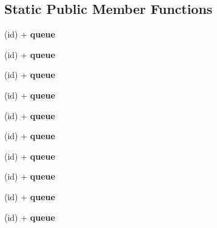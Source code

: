 \subsection*{\-Static \-Public \-Member \-Functions}
\begin{DoxyCompactItemize}
\item 
\hypertarget{interface_a_s_i_network_queue_af2b6cbcf9ce67a2480aeb8114a142941}{
(id) + {\bfseries queue}}
\label{interface_a_s_i_network_queue_af2b6cbcf9ce67a2480aeb8114a142941}

\item 
\hypertarget{interface_a_s_i_network_queue_af2b6cbcf9ce67a2480aeb8114a142941}{
(id) + {\bfseries queue}}
\label{interface_a_s_i_network_queue_af2b6cbcf9ce67a2480aeb8114a142941}

\item 
\hypertarget{interface_a_s_i_network_queue_af2b6cbcf9ce67a2480aeb8114a142941}{
(id) + {\bfseries queue}}
\label{interface_a_s_i_network_queue_af2b6cbcf9ce67a2480aeb8114a142941}

\item 
\hypertarget{interface_a_s_i_network_queue_af2b6cbcf9ce67a2480aeb8114a142941}{
(id) + {\bfseries queue}}
\label{interface_a_s_i_network_queue_af2b6cbcf9ce67a2480aeb8114a142941}

\item 
\hypertarget{interface_a_s_i_network_queue_af2b6cbcf9ce67a2480aeb8114a142941}{
(id) + {\bfseries queue}}
\label{interface_a_s_i_network_queue_af2b6cbcf9ce67a2480aeb8114a142941}

\item 
\hypertarget{interface_a_s_i_network_queue_af2b6cbcf9ce67a2480aeb8114a142941}{
(id) + {\bfseries queue}}
\label{interface_a_s_i_network_queue_af2b6cbcf9ce67a2480aeb8114a142941}

\item 
\hypertarget{interface_a_s_i_network_queue_af2b6cbcf9ce67a2480aeb8114a142941}{
(id) + {\bfseries queue}}
\label{interface_a_s_i_network_queue_af2b6cbcf9ce67a2480aeb8114a142941}

\item 
\hypertarget{interface_a_s_i_network_queue_af2b6cbcf9ce67a2480aeb8114a142941}{
(id) + {\bfseries queue}}
\label{interface_a_s_i_network_queue_af2b6cbcf9ce67a2480aeb8114a142941}

\item 
\hypertarget{interface_a_s_i_network_queue_af2b6cbcf9ce67a2480aeb8114a142941}{
(id) + {\bfseries queue}}
\label{interface_a_s_i_network_queue_af2b6cbcf9ce67a2480aeb8114a142941}

\item 
\hypertarget{interface_a_s_i_network_queue_af2b6cbcf9ce67a2480aeb8114a142941}{
(id) + {\bfseries queue}}
\label{interface_a_s_i_network_queue_af2b6cbcf9ce67a2480aeb8114a142941}

\end{DoxyCompactItemize}
